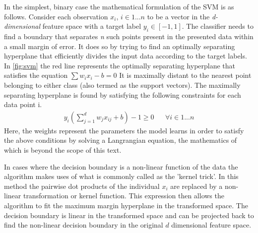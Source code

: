 \documentclass[msthesis.tex]{subfiles}
\begin{document}
In the simplest, binary case the mathematical formulation of the SVM is as follows. Consider each observation \textbf{$x_i$}, $i\in {1...n}$ to be a vector in the \textit{d-dimensional} feature space with a target label  $y_i\in {[-1,1]}$. The classifier needs to find a boundary that separates \textit{n} such points present in the presented data within a small margin of error.  It does so by trying to find an optimally separating hyperplane that efficiently divides the input data according to the target labels. In \autoref{fig:svm} the red line represents the optimally separating hyperplane that satisfies the equation
$ \sum w_i x_i - b = 0$
 It is maximally distant to the nearest point belonging to either class (also termed as the support vectors). The maximally separating hyperplane is found by satisfying the following constraints for each data point i. 
\begin{align}
    y_i(\sum_{j=1}^{d} w_{j} x_{ij}  + b)  - 1\geq 0 && \forall i \in {1...n}
\end{align}
Here, the weights represent the parameters the model learns in order to satisfy the above conditions by solving a Langrangian equation, the mathematics of which is beyond the scope of this text.  

In cases where the decision boundary is a non-linear function of the data the algorithm makes uses of what is commonly called as the 'kernel trick'. In this method the pairwise dot products of the individual $x_i$ are replaced by a non-linear transformation or kernel function. This expression then allows the algorithm to fit the maximum margin hyperplane in the transformed space. The decision boundary is linear in the transformed space and can be projected back to find the non-linear decision boundary in the original $d$ dimensional feature space. 
\end{document}
